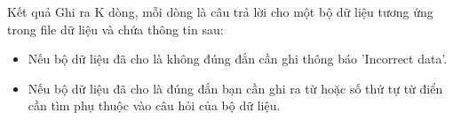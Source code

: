 Kết quả  
Ghi ra K dòng, mỗi dòng là câu trả lời cho một bộ dữ liệu tương ứng trong file dữ liệu và chứa thông tin sau:  
\begin{itemize}
	\item     Nếu bộ dữ liệu đã cho là không đúng đắn cần ghi thông báo 'Incorrect data'.   
	\item     Nếu bộ dữ liệu đã cho là đúng đắn bạn cần ghi ra từ hoặc số thứ tự từ điển cần tìm phụ thuộc vào câu hỏi của bộ dữ liệu.   
\end{itemize}